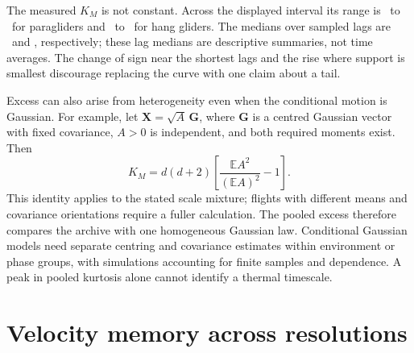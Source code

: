 The measured $K_M$ is not constant. Across the displayed interval its range is
\StatRevParaMardiaMin\ to \StatRevParaMardiaMax\ for paragliders and
\StatRevHangMardiaMin\ to \StatRevHangMardiaMax\ for hang gliders. The medians over
sampled lags are \StatRevParaMardiaMedian\ and \StatRevHangMardiaMedian, respectively;
these lag medians are descriptive summaries, not time averages. The change of sign near
the shortest lags and the rise where support is smallest discourage replacing the curve
with one claim about a tail.

Excess can also arise from heterogeneity even when the conditional motion is Gaussian.
For example, let $\mathbf X=\sqrt A\,\mathbf G$, where $\mathbf G$ is a centred Gaussian vector with
fixed covariance, $A>0$ is independent, and both required moments exist. Then
\begin{equation}
  K_M=d(d+2)\left[\frac{\mathbb E A^2}{(\mathbb E A)^2}-1\right].
  \label{eq:pooled-nongauss}
\end{equation}
This identity applies to the stated scale mixture; flights with different means
and covariance orientations require a fuller calculation. The pooled excess
therefore compares the archive with one homogeneous Gaussian law. Conditional
Gaussian models need separate centring and covariance estimates within environment
or phase groups, with simulations accounting for finite samples and dependence.
A peak in pooled kurtosis alone cannot identify a thermal timescale.

\section{Velocity memory across resolutions}
\label{sec:transport-memory}

